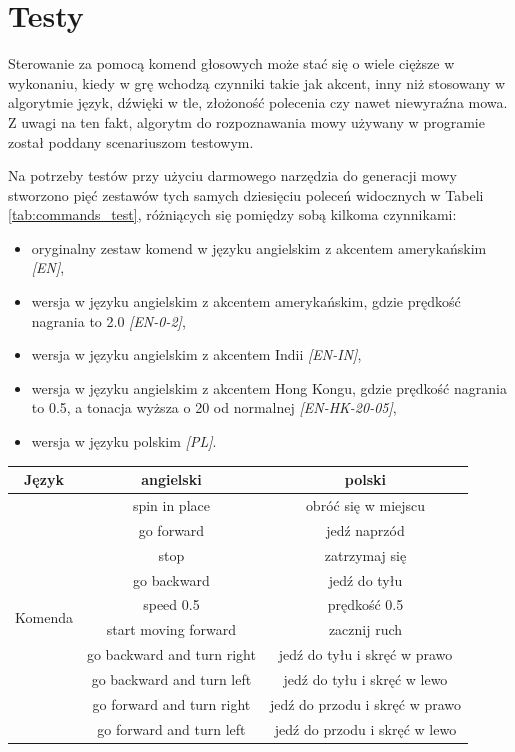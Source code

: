 \chapter{Testy}
\label{cha:testy}

Sterowanie za pomocą komend głosowych może stać się o wiele cięższe w wykonaniu, kiedy w grę wchodzą czynniki takie jak akcent, inny niż stosowany w algorytmie język, dźwięki w tle, złożoność polecenia czy nawet niewyraźna mowa. Z uwagi na ten fakt, algorytm do rozpoznawania mowy używany w programie został poddany scenariuszom testowym. 

Na potrzeby testów przy użyciu darmowego narzędzia do generacji mowy \cite{conv} stworzono pięć zestawów tych samych dziesięciu poleceń widocznych w Tabeli \ref{tab:commands_test}, różniących się pomiędzy sobą kilkoma czynnikami:
\begin{itemize}
    \item oryginalny zestaw komend w języku angielskim z akcentem amerykańskim \textit{[EN]},
    \item wersja w języku angielskim z akcentem amerykańskim, gdzie prędkość nagrania to 2.0 \textit{[EN-0-2]},
    \item wersja w języku angielskim z akcentem Indii \textit{[EN-IN]},
    \item wersja w języku angielskim z akcentem Hong Kongu, gdzie prędkość nagrania to 0.5, a tonacja wyższa o 20 od normalnej \textit{[EN-HK-20-05]},
    \item wersja w języku polskim \textit{[PL]}.
\end{itemize}
            
\begin{center}
    \begin{tabular}{ |c|c|c| } 
    \hline
    Język & angielski & polski \\
    \hline
    \multirow{10}{4em}{Komenda} & spin in place & obróć się w miejscu \\ 
    & go forward & jedź naprzód \\ 
    & stop & zatrzymaj się \\ 
    & go backward & jedź do tyłu \\ 
    & speed 0.5 & prędkość 0.5 \\ 
    & start moving forward & zacznij ruch \\ 
    & go backward and turn right & jedź do tyłu i skręć w prawo \\ 
    & go backward and turn left & jedź do tyłu i skręć w lewo \\ 
    & go forward and turn right & jedź do przodu i skręć w prawo \\ 
    & go forward and turn left & jedź do przodu i skręć w lewo \\ 
    \hline
    \end{tabular}
    \label{tab:commands_test}
\end{center}

